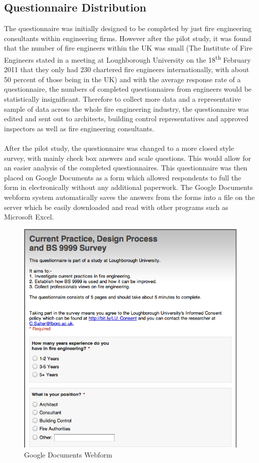 \documentclass[table,a4paper,oneside]{book}
\begin{document}
\subsection{Questionnaire Distribution}
\label{sec:Distribution}
The questionnaire was initially designed to be completed by just fire engineering consultants within engineering firms. However after the pilot study, it was found that the number of fire engineers within the UK was small (The Institute of Fire Engineers stated in a meeting at Loughborough University on the 18\textsuperscript{th} February 2011 that they only had 230 chartered fire engineers internationally, with about 50 percent of those being in the UK) and with the average response rate of a questionnaire, the numbers of completed questionnaires from engineers would be statistically insignificant. Therefore to collect more data and a representative sample of data across the whole fire engineering industry, the questionnaire was edited and sent out to architects, building control representatives and approved inspectors as well as fire engineering consultants.
\\
\\
After the pilot study, the questionnaire was changed to a more closed style survey, with mainly check box answers and scale questions. This would allow for an easier analysis of the completed questionnaires. This questionnaire was then placed on Google Documents as a form which allowed respondents to full the form in electronically without any additional paperwork. The Google Documents webform system automatically saves the answers from the forms into a file on the server which be easily downloaded and read with other programs such as Microsoft Excel.

\begin{figure}[htbp]
\centering
\includegraphics[width = 10 cm]{./Images/Webform}
\caption{Google Documents Webform}
\label{fig:Webform}
\end{figure}
\end{document}
